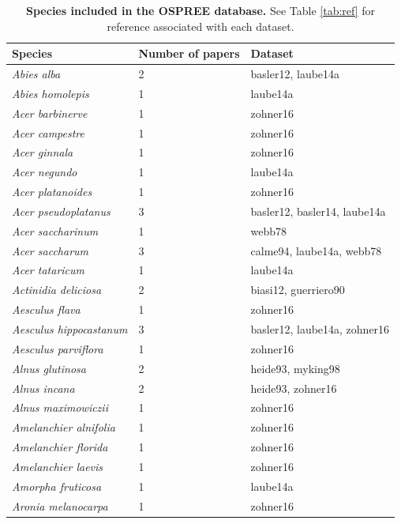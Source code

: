 \documentclass{article}
\begin{document}
\begin{footnotesize}
\begin{longtable}{p{}p{}p{}}
\caption{\textbf{Species included in the OSPREE database.} See Table \ref{tab:ref} for reference associated with each dataset.} \\ 
  \hline
Species & Number of papers & Dataset \\ 
  \hline \endhead  \hline
\textit{Abies alba} &   2 & basler12, laube14a \\ 
  \textit{Abies homolepis} &   1 & laube14a \\ 
  \textit{Acer barbinerve} &   1 & zohner16 \\ 
  \textit{Acer campestre} &   1 & zohner16 \\ 
  \textit{Acer ginnala} &   1 & zohner16 \\ 
  \textit{Acer negundo} &   1 & laube14a \\ 
  \textit{Acer platanoides} &   1 & zohner16 \\ 
  \textit{Acer pseudoplatanus} &   3 & basler12, basler14, laube14a \\ 
  \textit{Acer saccharinum} &   1 & webb78 \\ 
  \textit{Acer saccharum} &   3 & calme94, laube14a, webb78 \\ 
  \textit{Acer tataricum} &   1 & laube14a \\ 
  \textit{Actinidia deliciosa} &   2 & biasi12, guerriero90 \\ 
  \textit{Aesculus flava} &   1 & zohner16 \\ 
  \textit{Aesculus hippocastanum} &   3 & basler12, laube14a, zohner16 \\ 
  \textit{Aesculus parviflora} &   1 & zohner16 \\ 
  \textit{Alnus glutinosa} &   2 & heide93, myking98 \\ 
  \textit{Alnus incana} &   2 & heide93, zohner16 \\ 
  \textit{Alnus maximowiczii} &   1 & zohner16 \\ 
  \textit{Amelanchier alnifolia} &   1 & zohner16 \\ 
  \textit{Amelanchier florida} &   1 & zohner16 \\ 
  \textit{Amelanchier laevis} &   1 & zohner16 \\ 
  \textit{Amorpha fruticosa} &   1 & laube14a \\ 
  \textit{Aronia melanocarpa} &   1 & zohner16 \\ 

\end{longtable}
\end{footnotesize}
\end{document}

